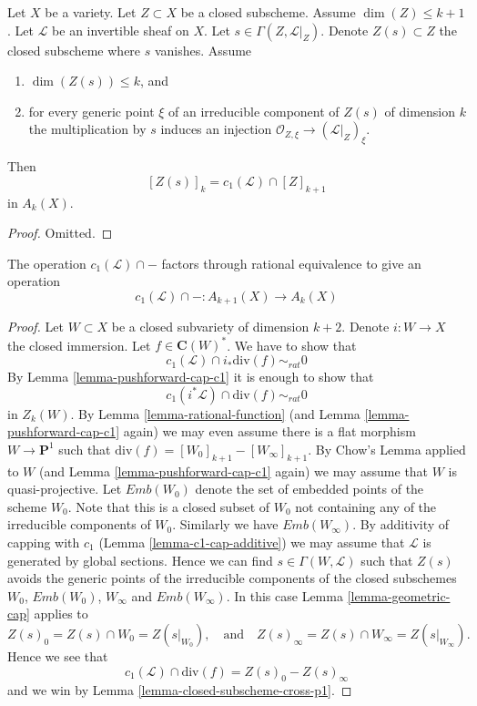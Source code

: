 \begin{lemma}
\label{lemma-geometric-cap}
Let $X$ be a variety.
Let $Z \subset X$ be a closed subscheme.
Assume $\dim(Z) \leq k + 1$.
Let $\mathcal{L}$ be an invertible sheaf on $X$.
Let $s \in \Gamma(Z, \mathcal{L}|_Z)$.
Denote $Z(s) \subset Z$ the closed subscheme where $s$ vanishes.
Assume
\begin{enumerate}
\item $\dim(Z(s)) \leq k$, and
\item for every generic point $\xi$ of an irreducible component of
$Z(s)$ of dimension $k$ the multiplication by $s$
induces an injection $\mathcal{O}_{Z, \xi} \to (\mathcal{L}|_Z)_\xi$.
\end{enumerate}
Then
$$
[Z(s)]_k = c_1(\mathcal{L}) \cap [Z]_{k + 1}
$$
in $A_k(X)$.
\end{lemma}

\begin{proof}
Omitted.
\end{proof}

\begin{lemma}
\label{lemma-factors}
The operation $c_1(\mathcal{L}) \cap -$ factors through rational equivalence
to give an operation
$$
c_1(\mathcal{L}) \cap - :
A_{k + 1}(X) \to A_k(X)
$$
\end{lemma}

\begin{proof}
Let $W \subset X$ be a closed subvariety of dimension $k + 2$.
Denote $i : W \to X$ the closed immersion.
Let $f \in \mathbf{C}(W)^*$. We have to show that
$$
c_1(\mathcal{L}) \cap i_*\text{div}(f) \sim_{rat} 0
$$
By Lemma \ref{lemma-pushforward-cap-c1} it is enough to show that
$$
c_1(i^*\mathcal{L}) \cap \text{div}(f) \sim_{rat} 0
$$
in $Z_k(W)$. By Lemma \ref{lemma-rational-function}
(and Lemma \ref{lemma-pushforward-cap-c1} again)
we may even assume
there is a flat morphism $W \to \mathbf{P}^1$
such that $\text{div}(f) = [W_0]_{k + 1} - [W_\infty]_{k + 1}$.
By Chow's Lemma applied to $W$
(and Lemma \ref{lemma-pushforward-cap-c1} again)
we may assume that $W$ is quasi-projective.
Let $Emb(W_0)$ denote the set of embedded
points of the scheme $W_0$. Note that this is
a closed subset of $W_0$ not containing any of the
irreducible components of $W_0$. Similarly we have
$Emb(W_\infty)$.
By additivity of capping with $c_1$ (Lemma \ref{lemma-c1-cap-additive}) we
may assume that $\mathcal{L}$ is generated by global sections.
Hence we can find $s \in \Gamma(W, \mathcal{L})$ such that
$Z(s)$ avoids the generic points of the irreducible components
of the closed subschemes $W_0$, $Emb(W_0)$, $W_\infty$ and $Emb(W_\infty)$.
In this case Lemma \ref{lemma-geometric-cap} applies to
$$
Z(s)_0 = Z(s) \cap W_0 = Z(s|_{W_0}),
\quad \text{and} \quad
Z(s)_\infty = Z(s) \cap W_\infty = Z(s|_{W_\infty}).
$$
Hence we see that
$$
c_1(\mathcal{L}) \cap \text{div}(f) =
Z(s)_0 - Z(s)_\infty
$$
and we win by Lemma \ref{lemma-closed-subscheme-cross-p1}.
\end{proof}


